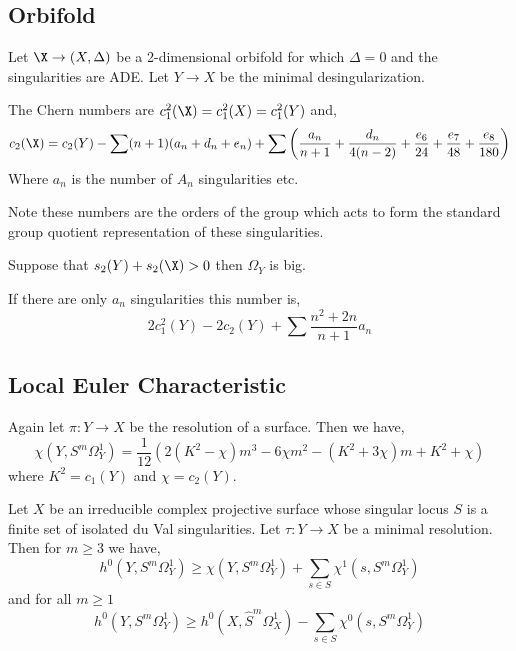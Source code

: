 \documentclass[12pt]{article}
\begin{document}
\subsection{Orbifold}

Let $\X \to (X, \Delta)$ be a 2-dimensional orbifold for which $\Delta = 0$ and the singularities are ADE. Let $Y \to X$ be the minimal desingularization.

\begin{prop}
The Chern numbers are $c_1^2(\X) = c_1^2(X) = c_1^2(Y)$ and,
\[ c_2(\X) = c_2(Y) - \sum (n+1) (a_n + d_n + e_n) + \sum \left( \frac{a_n}{n+1} + \frac{d_n}{4(n-2)} + \frac{e_6}{24} + \frac{e_7}{48} + \frac{e_8}{180} \right) \]
Where $a_n$ is the number of $A_n$ singularities etc.
\end{prop}

\begin{rmk}
Note these numbers are the orders of the group which acts to form the standard group quotient representation of these singularities.
\end{rmk}

\begin{theorem}
Suppose that $s_2(Y) + s_2(\X) > 0$ then $\Omega_Y$ is big.
\end{theorem}

\begin{cor}
If there are only $a_n$ singularities this number is,
\[ 2 c_1^2(Y) - 2 c_2(Y) + \sum \frac{n^2 + 2n}{n + 1} a_n \]
\end{cor}

\subsection{Local Euler Characteristic}

Again let $\pi : Y \to X$ be the resolution of a surface. Then we have,
\[ \chi(Y, S^m \Omega^1_Y) = \frac{1}{12} \left( 2 (K^2 - \chi) m^3 - 6 \chi m^2 - (K^2 + 3 \chi) m + K^2 + \chi \right) \]
where $K^2 = c_1(Y)$ and $\chi = c_2(Y)$. 

\begin{theorem}
Let $X$ be an irreducible complex projective surface whose singular locus $S$ is a finite set of isolated du Val singularities. Let $\tau : Y \to X$ be a minimal resolution. Then for $m \ge 3$ we have,
\[ h^0(Y, S^m \Omega_Y^1) \ge \chi(Y, S^m \Omega^1_Y) + \sum_{s \in S} \chi^1(s, S^m \Omega^1_Y) \]
and for all $m \ge 1$
\[ h^0(Y, S^m \Omega^1_Y) \ge h^0(X, \hat{S}^m \Omega^1_X) - \sum_{s \in S} \chi^0(s, S^m \Omega_Y^1) \]
\end{theorem}
\end{document}
